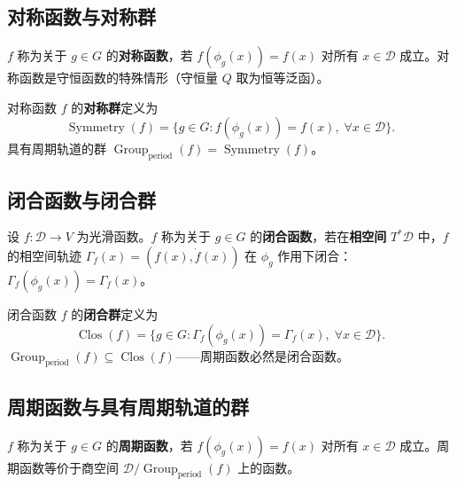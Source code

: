 \subsection{\texorpdfstring{对称函数与对称群}{对称函数与对称群}}

\begin{definition}[对称函数]\label{def:symmetry_function_gf}
$f$ 称为关于 $g \in G$ 的\textbf{对称函数}，若 $f(\phi_g(x)) = f(x)$ 对所有 $x \in \mathcal{D}$ 成立。对称函数是守恒函数的特殊情形（守恒量 $Q$ 取为恒等泛函）。
\end{definition}

\begin{definition}[对称群]\label{def:symmetry_group_gf}
对称函数 $f$ 的\textbf{对称群}定义为
\[
\operatorname{Symmetry}(f) = \{g \in G : f(\phi_g(x)) = f(x),\; \forall x \in \mathcal{D}\}.
\]
具有周期轨道的群 $\operatorname{Group}_{\mathrm{period}}(f) = \operatorname{Symmetry}(f)$。
\end{definition}

\subsection{\texorpdfstring{闭合函数与闭合群}{闭合函数与闭合群}}

\begin{definition}[闭合函数]\label{def:closure_function_gf}
设 $f: \mathcal{D} \to V$ 为光滑函数。$f$ 称为关于 $g \in G$ 的\textbf{闭合函数}，若在\textbf{相空间} $T^*\mathcal{D}$ 中，$f$ 的相空间轨迹 $\Gamma_f(x) = (f(x), \dot{f}(x))$ 在 $\phi_g$ 作用下闭合：$\Gamma_f(\phi_g(x)) = \Gamma_f(x)$。
\end{definition}

\begin{definition}[闭合群]\label{def:closure_group_gf}
闭合函数 $f$ 的\textbf{闭合群}定义为
\[
\operatorname{Clos}(f) = \{g \in G : \Gamma_f(\phi_g(x)) = \Gamma_f(x),\; \forall x \in \mathcal{D}\}.
\]
$\operatorname{Group}_{\mathrm{period}}(f) \subseteq \operatorname{Clos}(f)$——周期函数必然是闭合函数。
\end{definition}

\subsection{\texorpdfstring{周期函数与具有周期轨道的群}{周期函数与具有周期轨道的群}}

\begin{definition}[周期函数]\label{def:periodic_function_gf}
$f$ 称为关于 $g \in G$ 的\textbf{周期函数}，若 $f(\phi_g(x)) = f(x)$ 对所有 $x \in \mathcal{D}$ 成立。周期函数等价于商空间 $\mathcal{D}/\operatorname{Group}_{\mathrm{period}}(f)$ 上的函数。
\end{definition}

